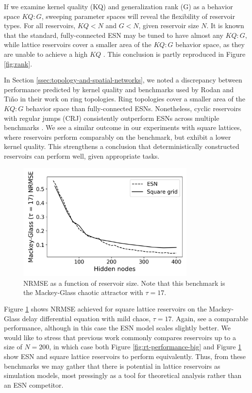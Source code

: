 If we examine kernel quality (KQ) and generalization rank (G) as a behavior
space $KQ:G$, sweeping parameter spaces will reveal the flexibility of reservoir
types. For all reservoirs, $KQ < N$ and $G < N$, given reservoir size $N$. It is
known that the standard, fully-connected ESN may be tuned to have almost any
$KQ:G$, while lattice reservoirs cover a smaller area of the $KQ:G$ behavior
space, as they are unable to achieve a high $KQ$
\cite{mcquillan_role_2019}. This conclusion is partly reproduced in Figure
\ref{fig:rank}.

In Section \ref{ssec:topology-and-spatial-networks}, we noted a discrepancy
between performance predicted by kernel quality and benchmarks used by Rodan and
Tiňo in their work on ring topologies. Ring topologies cover a smaller area of
the $KQ:G$ behavior space than fully-connected ESNs. Nonetheless, cyclic
reservoirs with regular jumps (CRJ) consistently outperform ESNs across multiple
benchmarks \cite{rodan_simple_2012}. We see a similar outcome in our experiments
with square lattices, where reservoirs perform comparably on the benchmark, but
exhibit a lower kernel quality. This strengthens a conclusion that
deterministically constructed reservoirs can perform well, given appropriate
tasks.

\begin{figure}[htb]
  \centering
  \includegraphics[width=3.5in]{figures/mg17.png}
  \caption{
    NRMSE as a function of reservoir size. Note that this benchmark is the
Mackey-Glass chaotic attractor with $\tau = 17$.
  }
  \label{fig:mg17}
\end{figure}

Figure \ref{fig:mg17} shows NRMSE achieved for square lattice reservoirs on the
Mackey-Glass delay differential equation with mild chaos, $\tau = 17$. Again,
see a comparable performance, although in this case the ESN model scales
slightly better. We would like to stress that previous work commonly compares
reservoirs up to a size of $N = 200$, in which case both Figure
\ref{fig:rt-performance-big} and Figure \ref{fig:mg17} show ESN and square
lattice reservoirs to perform equivalently. Thus, from these benchmarks we may
gather that there is potential in lattice reservoirs as simulation models, most
pressingly as a tool for theoretical analysis rather than an ESN competitor.

